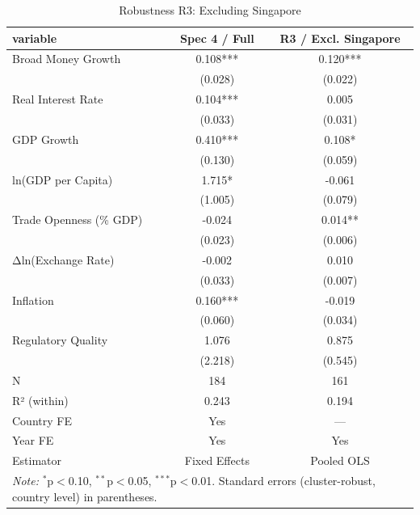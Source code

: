 \begin{table}[htbp]
\centering
\caption{Robustness R3: Excluding Singapore}
\label{tab:robustness_r3_no_sgp}
\begin{tabular}{lcc}
\hline\hline
variable & Spec 4 / Full & R3 / Excl. Singapore \\
\hline
Broad Money Growth & 0.108*** & 0.120*** \\
 & (0.028) & (0.022) \\
Real Interest Rate & 0.104*** & 0.005 \\
 & (0.033) & (0.031) \\
GDP Growth & 0.410*** & 0.108* \\
 & (0.130) & (0.059) \\
ln(GDP per Capita) & 1.715* & -0.061 \\
 & (1.005) & (0.079) \\
Trade Openness (\% GDP) & -0.024 & 0.014** \\
 & (0.023) & (0.006) \\
Δln(Exchange Rate) & -0.002 & 0.010 \\
 & (0.033) & (0.007) \\
Inflation & 0.160*** & -0.019 \\
 & (0.060) & (0.034) \\
Regulatory Quality & 1.076 & 0.875 \\
 & (2.218) & (0.545) \\
\hline
N & 184 & 161 \\
R² (within) & 0.243 & 0.194 \\
Country FE & Yes & — \\
Year FE & Yes & Yes \\
Estimator & Fixed Effects & Pooled OLS \\
\hline\hline
\multicolumn{3}{l}{\textit{Note:} $^{*}$p$<$0.10, $^{**}$p$<$0.05, $^{***}$p$<$0.01. Standard errors (cluster-robust, country level) in parentheses.}
\end{tabular}
\end{table}
